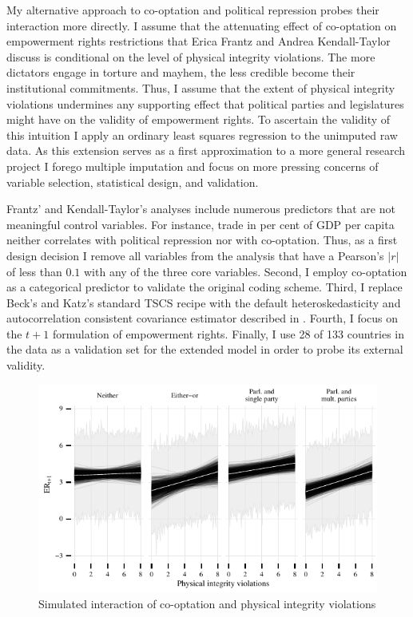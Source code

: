 My alternative approach to co-optation and political 
repression probes their interaction more directly. I assume
that the attenuating effect of co-optation on empowerment
rights restrictions that Erica Frantz and Andrea 
Kendall-Taylor discuss is conditional on the level of 
physical integrity violations. The more dictators engage in
torture and mayhem, the less credible become their 
institutional commitments. Thus, I assume that the extent
of physical integrity violations undermines any supporting 
effect that political parties and legislatures might have 
on the validity of empowerment rights. To ascertain the 
validity of this intuition I apply an ordinary least 
squares regression to the unimputed raw data. As this 
extension serves as a first approximation to a more 
general research project I forego multiple imputation and 
focus on more pressing concerns of variable selection, 
statistical design, and validation. 

Frantz' and Kendall-Taylor's analyses include numerous 
predictors that are not meaningful control variables. For 
instance, trade in per cent of GDP per capita 
neither correlates with political repression nor with 
co-optation. Thus, as a first design decision I remove all
variables from the analysis that have a Pearson's $|r|$ of 
less than $0.1$ with any of the three core variables. 
Second, I employ co-optation as a categorical predictor to
validate the original coding scheme. Third, I replace Beck's 
and Katz's standard TSCS recipe with the default 
heteroskedasticity and autocorrelation consistent covariance
estimator described in \citet[6]{Zeileis.2004}. Fourth, I 
focus on the $t+1$ formulation of empowerment 
rights. Finally, I use 28 of 133 countries in the data as a 
validation set for the extended model in order to probe its 
external validity.

\begin{figure}[!htb]
  \centering
  \includegraphics[width = \linewidth]{./sections/04extension/spaghettiInteraction.pdf}
  \caption{Simulated interaction of co-optation and physical integrity violations}
  \label{fig:simInteraction}
\end{figure}

